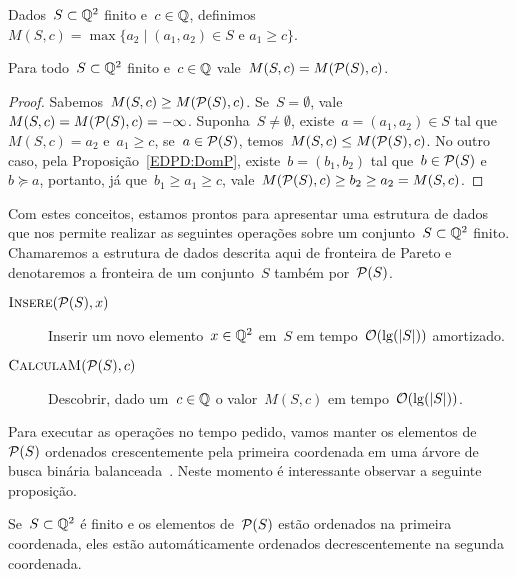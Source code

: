 \begin{defi}
Dados~$S \subset \mathbb{Q}^2$ finito e~$c \in \mathbb{Q}$, definimos~${M(S,c) = \max\{a_2 \mid (a_1,a_2) \in S \text{ e } a_1 \geq c\}}$.
\end{defi}

\begin{prop}
Para todo~$S \subset \mathbb{Q}^2$ finito e~$c \in \mathbb{Q}$ vale~$M(S,c) = M(\mathcal{P}(S),c)$.
\end{prop}

\begin{proof}
Sabemos~$M(S,c) \geq M(\mathcal{P}(S),c)$. Se~$S = \emptyset$, vale~${M(S,c) = M(\mathcal{P}(S),c) = -\infty}$. Suponha~$S \neq \emptyset$, existe~$a=(a_1,a_2) \in S$ tal que~$M(S,c) = a_2$ e~$a_1 \geq c$, se~$a \in \mathcal{P}(S)$, temos~${M(S,c) \leq M(\mathcal{P}(S),c)}$. No outro caso, pela Proposição~\ref{EDPD:DomP}, existe~$b =(b_1,b_2)$ tal que~$b \in \mathcal{P}(S)$ e~$b \succeq a$, portanto, já que~$b_1 \geq a_1 \geq c$, vale~$M(\mathcal{P}(S),c) \geq b_2 \geq a_2 = M(S,c)$.
\end{proof}

Com estes conceitos, estamos prontos para apresentar uma estrutura de dados que nos permite realizar as seguintes operações sobre um conjunto~$S \subset \mathbb{Q}^2$ finito. Chamaremos a estrutura de dados descrita aqui de fronteira de Pareto e denotaremos a fronteira de um conjunto~$S$ também por~$\mathcal{P}(S)$.

\begin{description}
\item[$\textsc{Insere}(\mathcal{P}(S),x)$] Inserir um novo elemento~$x \in \mathbb{Q}^2$ em~$S$ em tempo~$\mathcal{O}(\lg(|S|))$ amortizado. \label{EDPD:FP:add}
\item[$\textsc{CalculaM}(\mathcal{P}(S),c)$] Descobrir, dado um~$c \in \mathbb{Q}$ o valor~$M(S,c)$ em tempo~$\mathcal{O}(\lg(|S|))$. \label{EDPD:FP:query}
\end{description}

Para executar as operações no tempo pedido, vamos manter os elementos de~$\mathcal{P}(S)$ ordenados crescentemente pela primeira coordenada em uma árvore de busca binária balanceada~\cite[Capítulo 13]{CLRS}. Neste momento é interessante observar a seguinte proposição.

\begin{prop} \label{EDPD:doubleorder}
Se~$S \subset \mathbb{Q}^2$ é finito e os elementos de~$\mathcal{P}(S)$ estão ordenados na primeira coordenada, eles estão automáticamente ordenados decrescentemente na segunda coordenada.
\end{prop}

